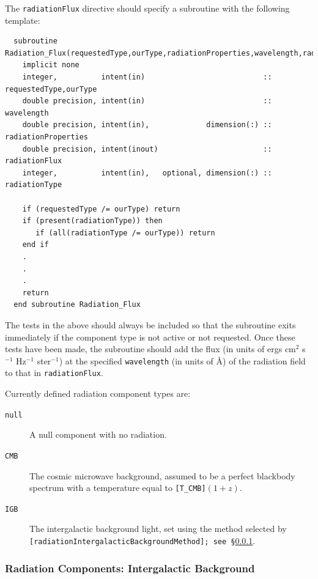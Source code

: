 The {\tt radiationFlux} directive should specify a subroutine with the following template:
\begin{verbatim}
  subroutine Radiation_Flux(requestedType,ourType,radiationProperties,wavelength,radiationFlux,radiationType)
    implicit none
    integer,          intent(in)                           :: requestedType,ourType
    double precision, intent(in)                           :: wavelength
    double precision, intent(in),             dimension(:) :: radiationProperties
    double precision, intent(inout)                        :: radiationFlux
    integer,          intent(in),   optional, dimension(:) :: radiationType

    if (requestedType /= ourType) return
    if (present(radiationType)) then
       if (all(radiationType /= ourType)) return
    end if
    .
    .
    .
    return
  end subroutine Radiation_Flux
\end{verbatim}
The tests in the above should always be included so that the subroutine exits immediately if the component type is not active or not requested. Once these tests have been made, the subroutine should add the flux (in units of ergs cm$^2$ s$^{-1}$ Hz$^{-1}$ ster$^{-1}$) at the specified {\tt wavelength} (in units of \AA) of the radiation field to that in {\tt radiationFlux}.

Currently defined radiation component types are:
\begin{description}
 \item [{\tt null}] A null component with no radiation.
 \item [{\tt CMB}] The cosmic microwave background, assumed to be a perfect blackbody spectrum with a temperature equal to {\tt [T\_CMB]}$(1+z)$.
 \item [{\tt IGB}] The intergalactic background light, set using the method selected by {\tt [radiationIntergalacticBackgroundMethod]; see \S\ref{sec:radiationIGB}}.
\end{description}

\subsubsection{Radiation Components: Intergalactic Background}\label{sec:radiationIGB}

